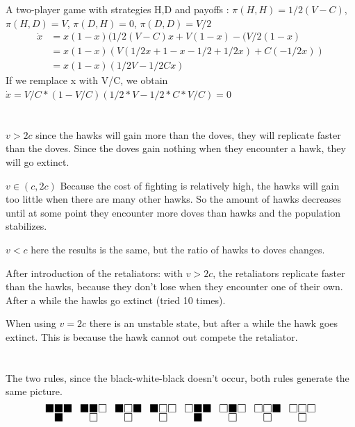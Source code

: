 \documentclass[11pt]{article}
\begin{document}
\section{}
A two-player game with strategies H,D and payoffs :  $\pi(H,H) = 1/2(V-C) $, $\pi(H,D) = V $, $\pi(D,H) = 0 $, $\pi(D,D) = V/2 $
\begin{align*}
\dot{x} & = x(1-x)(1/2(V-C)x+V(1-x)-(V/2(1-x) \\
& = x(1-x)(V(1/2x+1-x-1/2+1/2x) + C(-1/2x)) \\
& = x(1-x)(1/2V - 1/2Cx)
\end{align*}
If we remplace x with V/C, we obtain $\dot{x} = V/C*(1-V/C)(1/2*V-1/2*C*V/C) = 0$

\section{}

 $v>2c$ since the hawks will gain more than the doves, they will replicate faster than the doves. Since the doves gain nothing when they encounter a hawk, they will go extinct.
 
 $v \in (c,2c)$
 Because the cost of fighting is relatively high, the hawks will gain too little when there are many other hawks. So the amount of hawks decreases until at some point they encounter more doves than hawks and the population stabilizes.
 
 $v<c$ here the results is the same, but the ratio of hawks to doves changes.
 
 
 After introduction of the retaliators: with $v>2c$, the retaliators replicate faster than the hawks, because they don't lose when they encounter one of their own. After a while the hawks go extinct (tried 10 times).
 
 When using $v=2c$ there is an unstable state, but after a while the hawk goes extinct. This is because the hawk cannot out compete the retaliator.
\section{}
The two rules, since the black-white-black doesn't occur, both rules generate the same picture. 
\[ \LARGE
\substack{\blacksquare \blacksquare \blacksquare \\ \blacksquare} \enspace
\substack{\blacksquare \blacksquare \square \\ \square} \enspace
\substack{\blacksquare \square \blacksquare \\ \square } \enspace
\substack{\blacksquare \square \square \\ \square} \enspace
\substack{\square \blacksquare \blacksquare \\ \blacksquare} \enspace
\substack{\square \blacksquare \square \\ \square} \enspace
\substack{\square \square \blacksquare \\ \square} \enspace
\substack{\square \square \square \\ \square}
\]
\end{document}
